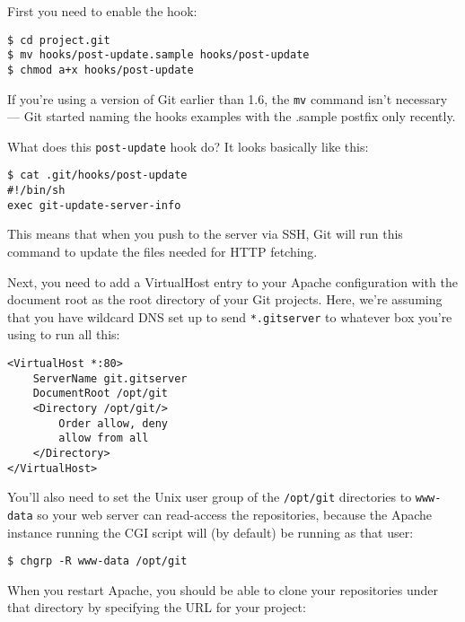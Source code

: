 \documentclass[a4paper]{book}
\begin{document}
First you need to enable the hook:

\begin{shaded}\begin{verbatim}
$ cd project.git
$ mv hooks/post-update.sample hooks/post-update
$ chmod a+x hooks/post-update
\end{verbatim}\end{shaded}

If you're using a version of Git earlier than 1.6, the \texttt{mv} command isn't necessary --- Git started naming the hooks examples with the .sample postfix only recently.

What does this \texttt{post-update} hook do? It looks basically like this:

\begin{shaded}\begin{verbatim}
$ cat .git/hooks/post-update
#!/bin/sh
exec git-update-server-info
\end{verbatim}\end{shaded}

This means that when you push to the server via SSH, Git will run this command to update the files needed for HTTP fetching.

Next, you need to add a VirtualHost entry to your Apache configuration with the document root as the root directory of your Git projects. Here, we're assuming that you have wildcard DNS set up to send \texttt{*.gitserver} to whatever box you're using to run all this:

\begin{shaded}\begin{verbatim}
<VirtualHost *:80>
    ServerName git.gitserver
    DocumentRoot /opt/git
    <Directory /opt/git/>
        Order allow, deny
        allow from all
    </Directory>
</VirtualHost>
\end{verbatim}\end{shaded}

You'll also need to set the Unix user group of the \texttt{/opt/git} directories to \texttt{www-data} so your web server can read-access the repositories, because the Apache instance running the CGI script will (by default) be running as that user:

\begin{shaded}\begin{verbatim}
$ chgrp -R www-data /opt/git
\end{verbatim}\end{shaded}

When you restart Apache, you should be able to clone your repositories under that directory by specifying the URL for your project:
\end{document}
